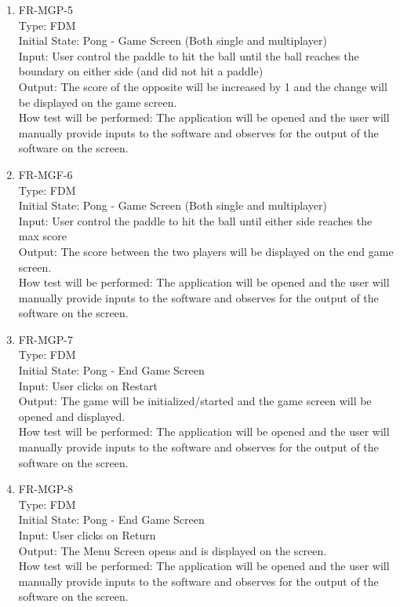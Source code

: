 \documentclass[12pt, titlepage]{article}
\begin{document}
\begin{enumerate}
\item{FR-MGP-5\\}
Type: FDM\\
Initial State: Pong - Game Screen (Both single and multiplayer)\\
Input: User control the paddle to hit the ball until the ball reaches the boundary on either side (and did not hit a paddle)\\
Output: The score of the opposite will be increased by 1 and the change will be displayed on the game screen.\\
How test will be performed: The application will be opened and the user will manually provide inputs to the software and observes for the output of the software on the screen.\\

\item{FR-MGF-6\\}
Type: FDM\\
Initial State: Pong - Game Screen (Both single and multiplayer)\\
Input: User control the paddle to hit the ball until either side reaches the max score\\
Output: The score between the two players will be displayed on the end game screen.\\
How test will be performed: The application will be opened and the user will manually provide inputs to the software and observes for the output of the software on the screen.\\

\item{FR-MGP-7\\}
Type: FDM\\
Initial State: Pong - End Game Screen\\
Input: User clicks on Restart\\
Output: The game will be initialized/started and the game screen will be opened and displayed.\\
How test will be performed: The application will be opened and the user will manually provide inputs to the software and observes for the output of the software on the screen.\\

\item{FR-MGP-8\\}
Type: FDM\\
Initial State: Pong - End Game Screen\\
Input: User clicks on Return\\
Output: The Menu Screen opens and is displayed on the screen.\\
How test will be performed: The application will be opened and the user will manually provide inputs to the software and observes for the output of the software on the screen.\\
    
\end{enumerate}
\end{document}
